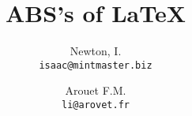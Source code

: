 \documentclass[12pt, a4paper]{article}
\title{ABS's of LaTeX}
\author{
  Newton, I.\\
  \texttt{isaac@mintmaster.biz}
  \and
  Arouet F.M.\\
  \texttt{li@arovet.fr}
}
\begin{document}
%

\maketitle








\printbibliography{}
\end{document}
